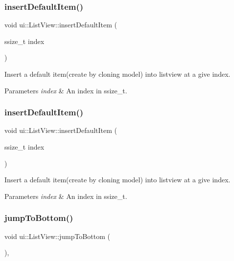 \subsubsection{\texorpdfstring{insert\+Default\+Item()}{insertDefaultItem()}\hspace{0.1cm}{\footnotesize\ttfamily [1/2]}}
{\footnotesize\ttfamily void ui\+::\+List\+View\+::insert\+Default\+Item (\begin{DoxyParamCaption}\item[{ssize\+\_\+t}]{index }\end{DoxyParamCaption})}

Insert a default item(create by cloning model) into listview at a give index. 
\begin{DoxyParams}{Parameters}
{\em index} & An index in ssize\+\_\+t. \\
\hline
\end{DoxyParams}
\mbox{\label{classui_1_1ListView_aca5f63e916a28a84842f8a1bc4320cdb}} 
\subsubsection{\texorpdfstring{insert\+Default\+Item()}{insertDefaultItem()}\hspace{0.1cm}{\footnotesize\ttfamily [2/2]}}
{\footnotesize\ttfamily void ui\+::\+List\+View\+::insert\+Default\+Item (\begin{DoxyParamCaption}\item[{ssize\+\_\+t}]{index }\end{DoxyParamCaption})}

Insert a default item(create by cloning model) into listview at a give index. 
\begin{DoxyParams}{Parameters}
{\em index} & An index in ssize\+\_\+t. \\
\hline
\end{DoxyParams}
\mbox{\label{classui_1_1ListView_a188c4b2a431157ef28ba92c26f1157cc}} 
\subsubsection{\texorpdfstring{jump\+To\+Bottom()}{jumpToBottom()}\hspace{0.1cm}{\footnotesize\ttfamily [1/2]}}
{\footnotesize\ttfamily void ui\+::\+List\+View\+::jump\+To\+Bottom (\begin{DoxyParamCaption}{ }\end{DoxyParamCaption})\hspace{0.3cm}{\ttfamily [override]}, {\ttfamily [virtual]}}

